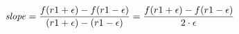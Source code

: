 \documentclass[11pt]{article}
\begin{document}
\[
\mbox{\it slope\/}
= \frac{f(r1+\epsilon) - f(r1-\epsilon)}{(r1+\epsilon) - (r1-\epsilon)}
= \frac{f(r1+\epsilon) - f(r1-\epsilon)}{2 \cdot \epsilon}
\]
\end{document}
